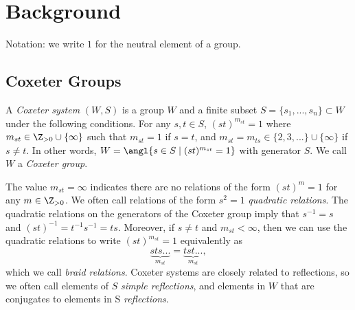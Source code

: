 \chapter{Background}


Notation: we write $1$ for the neutral element of a group.

\section{Coxeter Groups}

\begin{definition}
    A \textit{Coxeter system} $(W,S)$ is a group $W$ and a finite subset $S = \{s_1, ..., s_n\} \subset W$ under the following conditions. For any $s,t \in S$, $(st)^{m_{st}} = 1$ where $m_{st} \in \Z_{>0}\cup\{\infty\}$ such that  $m_{st} = 1$ if $s = t$, and $m_{st} = m_{ts} \in \{2,3,...\} \cup \{\infty\}$ if $s \neq t$. In other words, $W = \angl{s \in S \mathrel{|} (st)^{m_{st}} = 1}$ with generator $S$. We call $W$ a \textit{Coxeter group}.
\end{definition}

The value $m_{st} = \infty$ indicates there are no relations of the form $(st)^{m} = 1$ for any $m \in \Z_{>0}$. We often call relations of the form $s^2 = 1$ \textit{quadratic relations}. The quadratic relations on the generators of the Coxeter group imply that $s^{-1} = s$ and $(st)^{-1} = t^{-1} s^{-1} = ts$. Moreover, if $s \neq t$ and $m_{st} < \infty$, then we can use the quadratic relations to write $(st)^{m_{st}} = 1$ equivalently as
\[
    \underbrace{sts...}_{m_{st}} = \underbrace{tst...}_{m_{st}},
\]
which we call \textit{braid relations}.
Coxeter systems are closely related to reflections, so we often call elements of $S$ \textit{simple reflections}, and elements in $W$ that are conjugates to elements in S \textit{reflections}.

